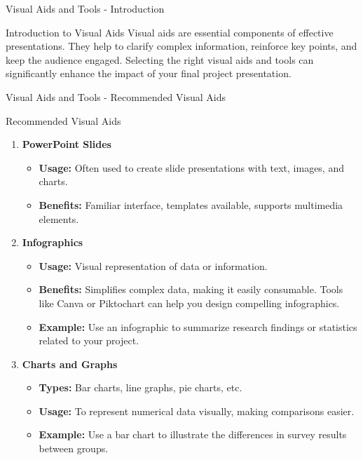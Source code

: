 \documentclass[aspectratio=169]{beamer}
\begin{document}
\begin{frame}[fragile]{Visual Aids and Tools - Introduction}
    \begin{block}{Introduction to Visual Aids}
        Visual aids are essential components of effective presentations. They help to clarify complex information, reinforce key points, and keep the audience engaged. Selecting the right visual aids and tools can significantly enhance the impact of your final project presentation.
    \end{block}
\end{frame}

\begin{frame}[fragile]{Visual Aids and Tools - Recommended Visual Aids}
    \begin{block}{Recommended Visual Aids}
        \begin{enumerate}
            \item \textbf{PowerPoint Slides}
                \begin{itemize}
                    \item \textbf{Usage:} Often used to create slide presentations with text, images, and charts.
                    \item \textbf{Benefits:} Familiar interface, templates available, supports multimedia elements.
                \end{itemize}
            \item \textbf{Infographics}
                \begin{itemize}
                    \item \textbf{Usage:} Visual representation of data or information.
                    \item \textbf{Benefits:} Simplifies complex data, making it easily consumable. Tools like Canva or Piktochart can help you design compelling infographics.
                    \item \textbf{Example:} Use an infographic to summarize research findings or statistics related to your project.
                \end{itemize}
            \item \textbf{Charts and Graphs}
                \begin{itemize}
                    \item \textbf{Types:} Bar charts, line graphs, pie charts, etc.
                    \item \textbf{Usage:} To represent numerical data visually, making comparisons easier.
                    \item \textbf{Example:} Use a bar chart to illustrate the differences in survey results between groups.

\end{itemize}
\end{enumerate}
\end{block}
\end{frame}
\end{document}
